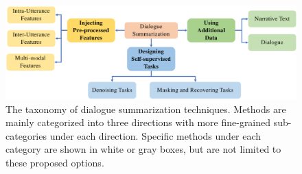 \begin{figure}
	\centering
	\includegraphics[scale=0.7]{fig/approaches.pdf}
	\caption{The taxonomy of dialogue summarization techniques. Methods are mainly categorized into three directions with more fine-grained sub-categories 
under each direction. Specific methods under each category are shown in 
white or gray boxes, but are not limited to these proposed options.}
	\label{fig:featuretaxonomy}
\end{figure}


